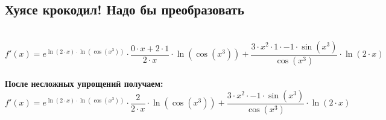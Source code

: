 \documentclass{article}
\begin{document}
\begin{Large}
\begin{onehalfspace}
\section*{Хуясе крокодил! Надо бы преобразовать}\\
$$ f'(x) = e^{\ln(2 \cdot x) \cdot \ln(\cos(x^{3}))} \cdot \frac{0 \cdot x + 2 \cdot 1}{2 \cdot x} \cdot \ln(\cos(x^{3})) + \frac{3 \cdot x^{2} \cdot 1 \cdot -1 \cdot \sin(x^{3})}{\cos(x^{3})} \cdot \ln(2 \cdot x)$$\\
\textbf{После несложных упрощений получаем: }\\
$$ f'(x) = e^{\ln(2 \cdot x) \cdot \ln(\cos(x^{3}))} \cdot \frac{2}{2 \cdot x} \cdot \ln(\cos(x^{3})) + \frac{3 \cdot x^{2} \cdot -1 \cdot \sin(x^{3})}{\cos(x^{3})} \cdot \ln(2 \cdot x)$$\\
\end{onehalfspace}
\end{Large}
\end{document}
